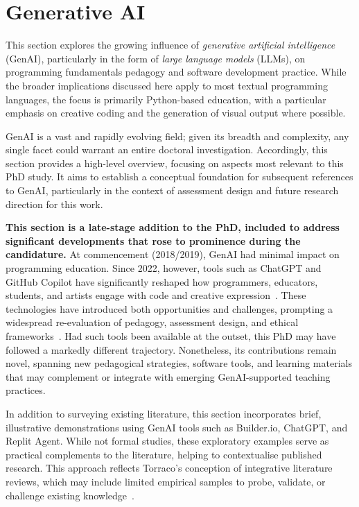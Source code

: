 
\section{Generative AI}
\label{sec:generative-ai}

This section explores the growing influence of \textit{generative artificial intelligence} (GenAI), particularly in the form of \textit{large language models} (LLMs), on programming fundamentals pedagogy and software development practice. While the broader implications discussed here apply to most textual programming languages, the focus is primarily Python-based education, with a particular emphasis on creative coding and the generation of visual output where possible.

GenAI is a vast and rapidly evolving field; given its breadth and complexity, any single facet could warrant an entire doctoral investigation. Accordingly, this section provides a high-level overview, focusing on aspects most relevant to this PhD study. It aims to establish a conceptual foundation for subsequent references to GenAI, particularly in the context of assessment design and future research direction for this work.

\textbf{This section is a late-stage addition to the PhD, included to address significant developments that rose to prominence during the candidature.} At commencement (2018/2019), GenAI had minimal impact on programming education. Since 2022, however, tools such as ChatGPT and GitHub Copilot have significantly reshaped how programmers, educators, students, and artists engage with code and creative expression~\cite{world_intellectual_property_organization_generative_2024}. These technologies have introduced both opportunities and challenges, prompting a widespread re-evaluation of pedagogy, assessment design, and ethical frameworks~\cite{odea_generative_2024}. Had such tools been available at the outset, this PhD may have followed a markedly different trajectory. Nonetheless, its contributions remain novel, spanning new pedagogical strategies, software tools, and learning materials that may complement or integrate with emerging GenAI-supported teaching practices.

In addition to surveying existing literature, this section incorporates brief, illustrative demonstrations using GenAI tools such as Builder.io, ChatGPT, and Replit Agent. While not formal studies, these exploratory examples serve as practical complements to the literature, helping to contextualise published research. This approach reflects Torraco's conception of integrative literature reviews, which may include limited empirical samples to probe, validate, or challenge existing knowledge~\cite{torraco_writing_2005}.


